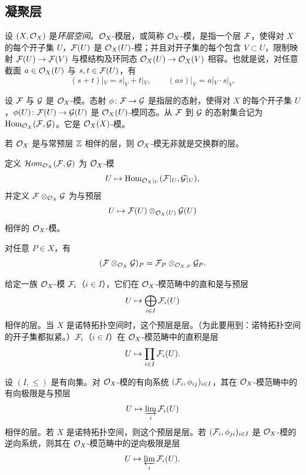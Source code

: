 \subsection{凝聚层}
\label{sec:1.4}

设 $(X,\mathcal{O}_X)$ 是\emph{环层空间}。$\mathcal{O}_X$-模层，或简称 $\mathcal{O}_X$-模，是指一个层 $\mathcal{F}$，使得对 $X$ 的每个开子集 $U$，$\mathcal{F}(U)$ 是 $\mathcal{O}_X(U)$-模；并且对开子集的每个包含 $V\subset U$，限制映射 $\mathcal{F}(U)\to\mathcal{F}(V)$ 与模结构及环同态 $\mathcal{O}_X(U)\to\mathcal{O}_X(V)$ 相容。也就是说，对任意截面 $a\in\mathcal{O}_X(U)$ 与 $s,t\in\mathcal{F}(U)$，有
\[
(s+t)|_V=s|_V+t|_V,\qquad (as)|_V=a|_V\cdot s|_V.
\]

设 $\mathcal{F}$ 与 $\mathcal{G}$ 是 $\mathcal{O}_X$-模。态射 $\phi\colon\mathcal{F}\to\mathcal{G}$ 是指层的态射，使得对 $X$ 的每个开子集 $U$，$\phi(U)\colon\mathcal{F}(U)\to\mathcal{G}(U)$ 是 $\mathcal{O}_X(U)$-模同态。从 $\mathcal{F}$ 到 $\mathcal{G}$ 的态射集合记为 $\operatorname{Hom}_{\mathcal{O}_X}(\mathcal{F},\mathcal{G})$。它是 $\mathcal{O}_X(X)$-模。

若 $\mathcal{O}_X$ 是与常预层 $\mathbb{Z}$ 相伴的层，则 $\mathcal{O}_X$-模无非就是交换群的层。

定义 $\mathcal{H}om_{\mathcal{O}_X}(\mathcal{F},\mathcal{G})$ 为 $\mathcal{O}_X$-模
\[
U\mapsto\operatorname{Hom}_{\mathcal{O}_X|_U}(\mathcal{F}|_U,\mathcal{G}|_U),
\]
并定义 $\mathcal{F}\otimes_{\mathcal{O}_X}\mathcal{G}$ 为与预层
\[
U\mapsto\mathcal{F}(U)\otimes_{\mathcal{O}_X(U)}\mathcal{G}(U)
\]
相伴的 $\mathcal{O}_X$-模。

对任意 $P\in X$，有
\[
(\mathcal{F}\otimes_{\mathcal{O}_X}\mathcal{G})_P=\mathcal{F}_P\otimes_{\mathcal{O}_{X,P}}\mathcal{G}_P.
\]

给定一族 $\mathcal{O}_X$-模 $\mathcal{F}_i$（$i\in I$），它们在 $\mathcal{O}_X$-模范畴中的直和是与预层
\[
U\mapsto\bigoplus_{i\in I}\mathcal{F}_i(U)
\]
相伴的层。当 $X$ 是诺特拓扑空间时，这个预层是层。（为此要用到：诺特拓扑空间的开子集都拟紧。）$\mathcal{F}_i$（$i\in I$）在 $\mathcal{O}_X$-模范畴中的直积是层
\[
U\mapsto\prod_{i\in I}\mathcal{F}_i(U).
\]

设 $(I,\le)$ 是有向集。对 $\mathcal{O}_X$-模的有向系统 $(\mathcal{F}_i,\phi_{ij})_{i\in I}$，其在 $\mathcal{O}_X$-模范畴中的有向极限是与预层
\[
U\mapsto\varinjlim_i\mathcal{F}_i(U)
\]
相伴的层。若 $X$ 是诺特拓扑空间，则这个预层是层。若 $(\mathcal{F}_i,\phi_{ji})_{i\in I}$ 是 $\mathcal{O}_X$-模的逆向系统，则其在 $\mathcal{O}_X$-模范畴中的逆向极限是层
\[
U\mapsto\varprojlim_i\mathcal{F}_i(U).
\]

